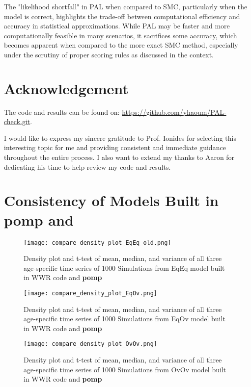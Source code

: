 \documentclass[10pt]{article}
\begin{document}
The "likelihood shortfall" in PAL when compared to SMC, particularly when the model is correct, highlights the trade-off between computational efficiency and accuracy in statistical approximations. While PAL may be faster and more computationally feasible in many scenarios, it sacrifices some accuracy, which becomes apparent when compared to the more exact SMC method, especially under the scrutiny of proper scoring rules as discussed in the context.

\section{Acknowledgement}

The code and results can be found on: \url{https://github.com/yhaoum/PAL-check.git}.

I would like to express my sincere gratitude to Prof. Ionides for selecting this interesting topic for me and providing consistent and immediate guidance throughout the entire process. I also want to extend my thanks to Aaron for dedicating his time to help review my code and results.

\newpage
\appendix
\section{Consistency of Models Built in \textbf{pomp} and \cite{wwr}}\label{appendA}

\begin{figure}[H]
\centering
\texttt{[image: compare\_density\_plot\_EqEq\_old.png]}
\caption{\label{fig:rotavirus} Density plot and t-test of mean, median, and variance of all three age-specific time series of 1000 Simulations from EqEq model built in WWR code and \textbf{pomp}}
\end{figure}

\begin{figure}[H]
\centering
\texttt{[image: compare\_density\_plot\_EqOv.png]}
\caption{\label{fig:rotavirus} Density plot and t-test of mean, median, and variance of all three age-specific time series of 1000 Simulations from EqOv model built in WWR code and \textbf{pomp}}
\end{figure}

\begin{figure}[H]
\centering
\texttt{[image: compare\_density\_plot\_OvOv.png]}
\caption{\label{fig:rotavirus} Density plot and t-test of mean, median, and variance of all three age-specific time series of 1000 Simulations from OvOv model built in WWR code and \textbf{pomp}}
\end{figure}
\end{document}
